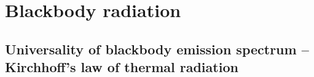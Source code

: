 

\chapter{Blackbody radiation}
\setcounter{theorem}{0}
\setcounter{equation}{0}


\renewcommand{\theenumi}{\roman{enumi}}
\renewcommand{\labelenumi}{\textnormal{(\theenumi)}$\;\;$}


\section{Universality of blackbody emission spectrum -- Kirchhoff's law of thermal radiation}


